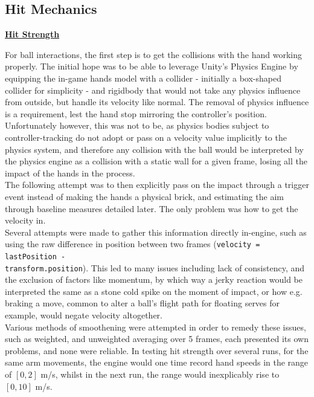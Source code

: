 \subsection{Hit Mechanics}
\label{subsec::hitting-mechanics}

\noindent\textbf{\underline{Hit Strength}}

For ball interactions, the first step is to get the collisions with the hand working properly. The initial hope was to be able to leverage Unity's Physics Engine by equipping the in-game hands model with a collider - initially a box-shaped collider for simplicity - and rigidbody that would not take any physics influence from outside, but handle its velocity like normal. The removal of physics influence is a requirement, lest the hand stop mirroring the controller's position.\\
Unfortunately however, this was not to be, as physics bodies subject to controller-tracking do not adopt or pass on a velocity value implicitly to the physics system, and therefore any collision with the ball would be interpreted by the physics engine as a collision with a static wall for a given frame, losing all the impact of the hands in the process.\\

The following attempt was to then explicitly pass on the impact through a trigger event instead of making the hands a physical brick, and estimating the aim through baseline measures detailed later. The only problem was how to get the velocity in.\\
Several attempts were made to gather this information directly in-engine, such as using the raw difference in position between two frames (\verb|velocity = lastPosition -|\\\verb|transform.position|). This led to many issues including lack of consistency, and the exclusion of factors like momentum, by which way a jerky reaction would be interpreted the same as a stone cold spike on the moment of impact, or how e.g. braking a move, common to alter a ball's flight path for floating serves for example, would negate velocity altogether.\\
Various methods of smoothening were attempted in order to remedy these issues, such as weighted, and unweighted averaging over 5 frames, each presented its own problems, and none were reliable. In testing hit strength over several runs, for the same arm movements, the engine would one time record hand speeds in the range of $[0, 2]$ m/s, whilst in the next run, the range would inexplicably rise to $[0, 10]$ m/s.\\

